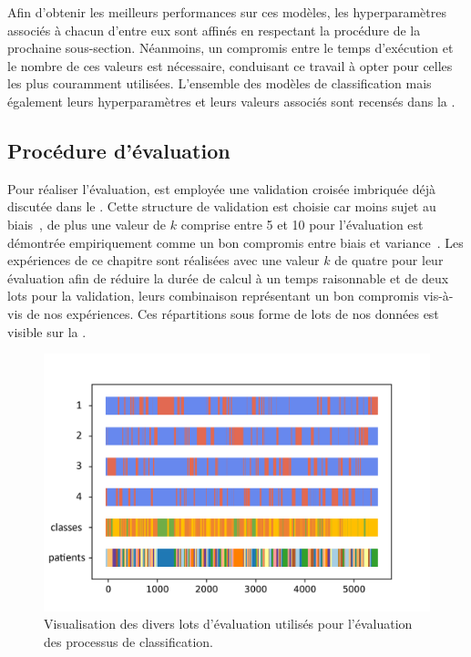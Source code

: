 Afin d'obtenir les meilleurs performances sur ces modèles, les hyperparamètres associés à chacun d'entre eux sont affinés en respectant la procédure de la prochaine sous-section. Néanmoins, un compromis entre le temps d'exécution et le nombre de ces valeurs est nécessaire, conduisant ce travail à opter pour celles les plus couramment utilisées. L'ensemble des modèles de classification mais également leurs hyperparamètres et leurs valeurs associés sont recensés dans la .\par

\subsection{Procédure d'évaluation}
Pour réaliser l'évaluation, est employée une validation croisée imbriquée déjà discutée dans le . Cette structure de validation est choisie car moins sujet au biais~\cite{Cawley2010}, de plus une valeur de $k$ comprise entre 5 et 10 pour l'évaluation est démontrée empiriquement comme un bon compromis entre biais et variance~\cite{James2000}. Les expériences de ce chapitre sont réalisées avec une valeur $k$ de quatre pour leur évaluation afin de réduire la durée de calcul à un temps raisonnable et de deux lots pour la validation, leurs combinaison représentant un bon compromis vis-à-vis de nos expériences. Ces répartitions sous forme de lots de nos données est visible sur la .\par

\begin{figure}[H]
    \centering
    \includegraphics[width=0.9\linewidth]{contents/chapter_5/resources/visualisation_folds.png}
    \caption{Visualisation des divers lots d'évaluation utilisés pour l'évaluation des processus de classification.}
    \label{fig:visualisation_folds}
\end{figure}\par

